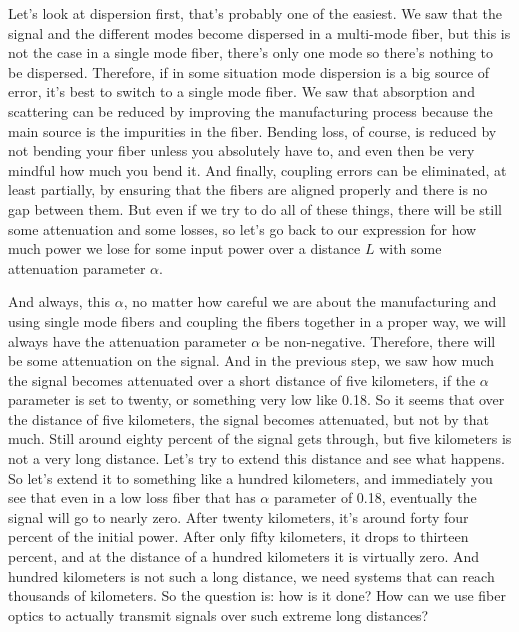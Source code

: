 Let's look at dispersion first, that's probably one of the easiest. We saw that the signal and the different modes become dispersed in a multi-mode fiber, but this is not the case in a single mode fiber, there's only one mode so there's nothing to be dispersed. Therefore, if in some situation mode dispersion is a big source of error, it's best to switch to a single mode fiber. We saw that absorption and scattering can be reduced by improving the manufacturing process because the main source is the impurities in the fiber. Bending loss, of course, is  reduced by not bending your fiber unless you absolutely have to, and even then be very mindful how much you bend it. And finally, coupling errors can be eliminated, at least partially, by ensuring that the fibers are aligned properly and there is no gap between them. But even if we try to do all of these things, there will be still some attenuation and some losses, so let's go back to our expression for how much power we lose for some input power over a distance $L$ with some attenuation parameter $\alpha$.

And always, this $\alpha$, no matter how careful we are about the manufacturing and using single mode fibers and coupling the fibers together in a proper way, we will always have the attenuation parameter $\alpha$ be non-negative. Therefore, there will be some attenuation on the signal. And in the previous step, we saw how much the signal becomes attenuated over a short distance of five kilometers, if the $\alpha$ parameter is set to twenty, or something very low like 0.18. So it seems that over the distance of five kilometers, the signal becomes attenuated, but not by that much. Still around eighty percent of the signal gets through, but five kilometers is not a very long distance. Let's try to extend this distance and see what happens. So let's extend it to something like a hundred kilometers, and immediately you see that even in a low loss fiber that has $\alpha$ parameter of 0.18, eventually the signal will go to nearly zero. After twenty kilometers, it's around forty four percent of the initial power. After only fifty kilometers, it drops to thirteen percent, and at the distance of a hundred kilometers it is virtually zero. And hundred kilometers is not such a long distance, we need systems that can reach thousands of kilometers. So the question is: how is it done? How can we use fiber optics to actually transmit signals over such extreme long distances?

